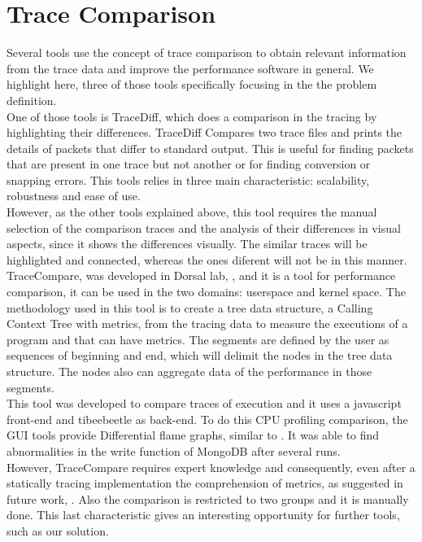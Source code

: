 \section{Trace Comparison}
Several tools use the concept of trace comparison to obtain relevant information from the trace data and improve the performance software in general. We highlight here, three of those tools specifically focusing in the the problem definition.\\
One of those tools is TraceDiff\cite{trace_diff}, which does a comparison in the tracing by highlighting their differences. TraceDiff Compares  two  trace files and prints the details of packets that differ to standard output. This is useful for finding packets that are  present  in one trace but not another or for finding conversion or snapping errors. This tools relies in three main characteristic: scalability, robustness and ease of use. \\
However, as the other tools explained above, this tool requires the manual selection of the comparison traces and the analysis of their differences in visual aspects, since it shows the differences visually. The similar traces will be highlighted and connected, whereas the ones diferent will not be in this manner. \\
TraceCompare, was developed in Dorsal lab, \cite{tracecompare}, and it is a tool for performance comparison, it can be used in the two domains: userspace and kernel space. 
The methodology used in this tool is to create a tree data structure, a Calling Context Tree with metrics, from the tracing data to measure the executions of a program and that can have metrics. The segments are defined by the user as sequences of beginning and end, which will delimit the nodes in the tree data structure. The nodes also can aggregate data of the performance in those segments. \\
This tool was developed to compare traces of execution and it uses a javascript front-end and tibeebeetle as back-end. To do this CPU profiling comparison, the GUI tools provide Differential flame graphs, similar to  \cite{differential_flame}. It was able to find abnormalities in the write function of MongoDB after several runs. \\
However, TraceCompare requires expert knowledge and consequently, even after a statically tracing implementation the comprehension of metrics, as suggested in future work, \cite{doray_thesis}. Also the comparison is restricted to two groups and it is manually done. This last characteristic gives an interesting opportunity for further tools, such as our solution. 
